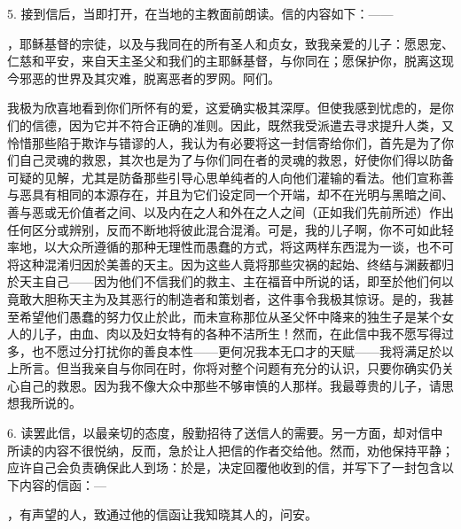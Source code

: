 5. 接到信后，当即打开，在当地的主教面前朗读。信的内容如下：——\par

，耶稣基督的宗徒，以及与我同在的所有圣人和贞女，致我亲爱的儿子：愿恩宠、仁慈和平安，来自天主圣父和我们的主耶稣基督，与你同在；愿保护你，脱离这现今邪恶的世界及其灾难，脱离恶者的罗网。阿们。\par

我极为欣喜地看到你们所怀有的爱，这爱确实极其深厚。但使我感到忧虑的，是你们的信德，因为它并不符合正确的准则。因此，既然我受派遣去寻求提升人类，又怜惜那些陷于欺诈与错谬的人，我认为有必要将这一封信寄给你们，首先是为了你们自己灵魂的救恩，其次也是为了与你们同在者的灵魂的救恩，好使你们得以防备可疑的见解，尤其是防备那些引导心思单纯者的人向他们灌输的看法。他们宣称善与恶具有相同的本源存在，并且为它们设定同一个开端，却不在光明与黑暗之间、善与恶或无价值者之间、以及内在之人和外在之人之间（正如我们先前所述）作出任何区分或辨别，反而不断地将彼此混合混淆。可是，我的儿子啊，你不可如此轻率地，以大众所遵循的那种无理性而愚蠢的方式，将这两样东西混为一谈，也不可将这种混淆归因於美善的天主。因为这些人竟将那些灾祸的起始、终结与渊薮都归於天主自己——因为他们不信我们的救主、主在福音中所说的话，即至於他们何以竟敢大胆称天主为及其恶行的制造者和策划者，这件事令我极其惊讶。是的，我甚至希望他们愚蠢的努力仅止於此，而未宣称那位从圣父怀中降来的独生子是某个女人的儿子，由血、肉以及妇女特有的各种不洁所生！然而，在此信中我不愿写得过多，也不愿过分打扰你的善良本性——更何况我本无口才的天赋——我将满足於以上所言。但当我亲自与你同在时，你将对整个问题有充分的认识，只要你确实仍关心自己的救恩。因为我不像大众中那些不够审慎的人那样。我最尊贵的儿子，请思想我所说的。\par

6. 读罢此信，以最亲切的态度，殷勤招待了送信人的需要。另一方面，却对信中所读的内容不很悦纳，反而，急於让人把信的作者交给他。然而，劝他保持平静；应许自己会负责确保此人到场：於是，决定回覆他收到的信，并写下了一封包含以下内容的信函：—\par

，有声望的人，致通过他的信函让我知晓其人的，问安。\par

